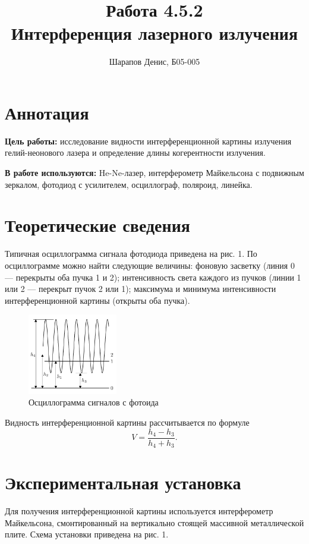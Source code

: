 \documentclass[a4paper]{article}
\title{Работа 4.5.2 \\ Интерференция лазерного излучения}
\author{Шарапов Денис, Б05-005}
\date{}
\begin{document}
    \maketitle
    \tableofcontents
    \newpage
    
\section{Аннотация}

\noindent\textbf{Цель работы:} исследование видности интерференционной картины излучения гелий-неонового лазера и определение длины когерентности излучения. \smallskip
 
\noindent \textbf{В работе используются:} He-Ne-лазер, интерферометр Майкельсона с подвижным зеркалом, фотодиод с усилителем, осциллограф, поляроид, линейка.

\section{Теоретические сведения}

Типичная осциллограмма сигнала фотодиода приведена на рис. 1. По осциллограмме можно найти следующие величины: фоновую засветку (линия 0 — перекрыты оба пучка 1 и 2); интенсивность света каждого из пучков (линии 1 или 2 — перекрыт пучок 2 или 1); максимума и минимума интенсивности интерференционной картины (открыты оба пучка).

\begin{figure}[ht!]
    \centering
    \includegraphics[width = 0.35\textwidth]{image/picture1.png}
    \caption{Осциллограмма сигналов с фотоида}
\end{figure}

\noindent Видность интерференционной картины рассчитывается по формуле $$V = \frac{h_4 - h_3}{h_4 + h_3}.$$

\section{Экспериментальная установка}

Для получения интерференционной картины используется интерферометр Майкельсона, смонтированный на вертикально стоящей массивной металлической плите. Схема установки приведена на рис. 1.
\end{document}
